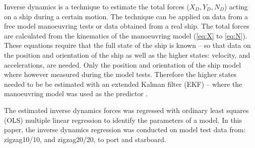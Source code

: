 Inverse dynamics is a technique to estimate the total forces ($X_D,Y_D,N_D$) acting on a ship during a certain motion. The technique can be applied on data from a free model manoeuvring tests or data obtained from a real ship. The total forces are calculated from the kinematics of the manoeuvring model (\autoref{eq:X} to \autoref{eq:N}). These equations require that the full state of the ship is known -- so that data on the position and orientation of the ship as well as the higher states: velocity, and accelerations, are needed.
Only the position and orientation of the ship model where however measured during the model tests.
Therefore the higher states needed to be be estimated with an extended Kalman filter (EKF) -- where the manoeuvring model was used as the predictor \citep{alexandersson_wpcc_2022}.

The estimated inverse dynamics forces was regressed with ordinary least squares (OLS) multiple
linear regression to identify the parameters of a model. In this paper, the inverse dynamics regression was conducted on model test data from: zigzag10/10, and zigzag20/20, to port and starboard.  